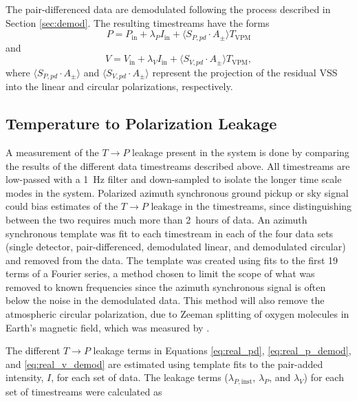 \documentclass[twocolumn, tighten, numberedappendix, twocolappendix]{aastex63}
\begin{document}
The pair-differenced data are demodulated following the process described in Section \ref{sec:demod}. The resulting timestreams have the forms
\begin{equation}
    P = P_\mathrm{in}+\lambda_P I_\mathrm{in} + \langle S_{P,pd} \cdot A_{\pm}\rangle T_\mathrm{VPM}
    \label{eq:real_p_demod}
\end{equation}
\noindent and
\begin{equation}
    V = V_\mathrm{in}+\lambda_V I_\mathrm{in} + \langle S_{V,pd} \cdot A_{\pm}\rangle T_\mathrm{VPM},
    \label{eq:real_v_demod}
\end{equation}
\noindent where $\langle S_{P,pd} \cdot A_{\pm}\rangle$ and $\langle S_{V,pd} \cdot A_{\pm}\rangle$ represent the projection of the residual VSS into the linear and circular polarizations, respectively.

\subsection{Temperature to Polarization Leakage}

A measurement of the $T\rightarrow P$ leakage present in the system is done by comparing the results of the different data timestreams described above. All timestreams are low-passed with a 1~Hz filter and down-sampled to isolate the longer time scale modes in the system. Polarized azimuth synchronous ground pickup or sky signal could bias estimates of the $T\rightarrow P$ leakage in the timestreams, since distinguishing between the two requires much more than 2~hours of data. An azimuth synchronous template was fit to each timestream in each of the four data sets (single detector, pair-differenced, demodulated linear, and demodulated circular) and removed from the data. The template was created using fits to the first 19 terms of a Fourier series, a method chosen to limit the scope of what was removed to known frequencies since the azimuth synchronous signal is often below the noise in the demodulated data. This method will also remove the atmospheric circular polarization, due to Zeeman splitting of oxygen molecules in Earth's magnetic field, which was measured by \cite{petr20}. 

The different $T\rightarrow P$ leakage terms in Equations \ref{eq:real_pd}, \ref{eq:real_p_demod}, and \ref{eq:real_v_demod} are estimated using template fits to the pair-added intensity, $I$, for each set of data. The leakage terms ($\lambda_{P,\mathrm{inst}}$, $\lambda_{P}$, and $\lambda_{V}$) for each set of timestreams were calculated as
\end{document}
